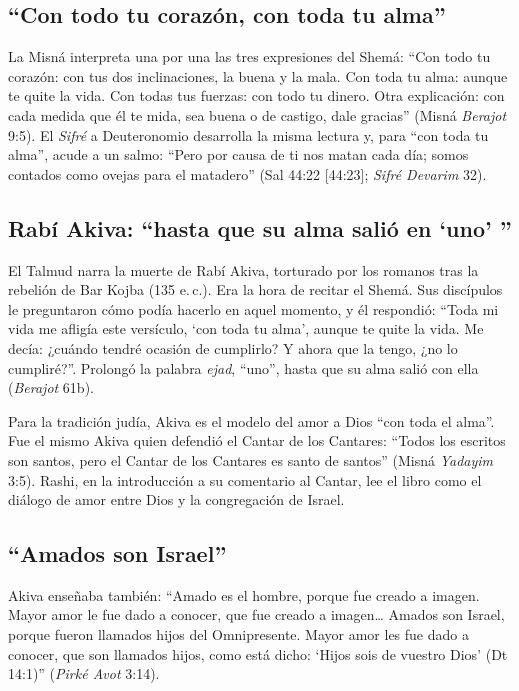 \subsection{“Con todo tu corazón, con toda tu alma”}
La Misná interpreta una por una las tres expresiones del Shemá: ``Con todo tu corazón: con tus dos inclinaciones, la buena y la mala. Con toda tu alma: aunque te quite la vida. Con todas tus fuerzas: con todo tu dinero. Otra explicación: con cada medida que él te mida, sea buena o de castigo, dale gracias'' (Misná \emph{Berajot} 9:5). El \emph{Sifré} a Deuteronomio desarrolla la misma lectura y, para ``con toda tu alma'', acude a un salmo: ``Pero por causa de ti nos matan cada día; somos contados como ovejas para el matadero'' (Sal 44:22 [44:23]; \emph{Sifré Devarim} 32).


\subsection{Rabí Akiva: “hasta que su alma salió en `uno' ”}
El Talmud narra la muerte de Rabí Akiva, torturado por los romanos tras la rebelión de Bar Kojba (135 e.\,c.). Era la hora de recitar el Shemá. Sus discípulos le preguntaron cómo podía hacerlo en aquel momento, y él respondió: ``Toda mi vida me afligía este versículo, `con toda tu alma', aunque te quite la vida. Me decía: ¿cuándo tendré ocasión de cumplirlo? Y ahora que la tengo, ¿no lo cumpliré?''. Prolongó la palabra \emph{ejad}, ``uno'', hasta que su alma salió con ella (\emph{Berajot} 61b).


Para la tradición judía, Akiva es el modelo del amor a Dios ``con toda el alma''. Fue el mismo Akiva quien defendió el Cantar de los Cantares: ``Todos los escritos son santos, pero el Cantar de los Cantares es santo de santos'' (Misná \emph{Yadayim} 3:5). Rashi, en la introducción a su comentario al Cantar, lee el libro como el diálogo de amor entre Dios y la congregación de Israel.

\subsection{“Amados son Israel”}
Akiva enseñaba también: ``Amado es el hombre, porque fue creado a imagen. Mayor amor le fue dado a conocer, que fue creado a imagen\ldots{} Amados son Israel, porque fueron llamados hijos del Omnipresente. Mayor amor les fue dado a conocer, que son llamados hijos, como está dicho: `Hijos sois de \SENOR{} vuestro Dios' (Dt 14:1)'' (\emph{Pirké Avot} 3:14).

